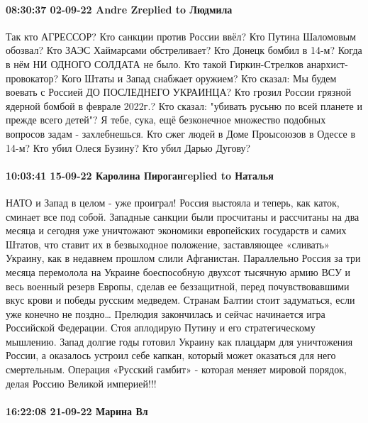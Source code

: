 \paragraph{08:30:37 02-09-22 Andre Zreplied to Людмила}

Так кто АГРЕССОР?
Кто санкции против России ввёл?
Кто Путина Шаломовым обозвал?
Кто ЗАЭС Хаймарсами обстреливает?
Кто Донецк бомбил в 14-м? Когда в нём НИ ОДНОГО СОЛДАТА не было.
Кто такой Гиркин-Стрелков анархист-провокатор?
Кого Штаты и Запад снабжает оружием?
Кто сказал: Мы будем воевать с Россией ДО ПОСЛЕДНЕГО УКРАИНЦА?
Кто грозил России грязной ядерной бомбой в феврале 2022г.?
Кто сказал: "убивать русьню по всей планете и прежде всего детей"?
Я тебе, сука, ещё безконечное множество подобных вопросов задам - захлебнешься.
Кто сжег людей в Доме Проысоюзов в Одессе в 14-м?
Кто убил Олеся Бузину?
Кто убил Дарью Дугову?

\paragraph{10:03:41 15-09-22 Каролина Пироганreplied to Наталья}

НАТО и Запад в целом - уже проиграл!
Россия выстояла и теперь, как каток, сминает все под собой.
Западные санкции были просчитаны и рассчитаны на два месяца и сегодня уже уничтожают экономики европейских государств и самих Штатов, что ставит их в безвыходное положение, заставляющее «сливать» Украину, как в недавнем прошлом слили Афганистан.
Параллельно Россия за три месяца перемолола на Украине боеспособную двухсот тысячную армию ВСУ и весь военный резерв Европы, сделав ее беззащитной, перед почувствовавшими вкус крови и победы русским медведем. Странам Балтии стоит задуматься, если уже конечно не поздно…
Прелюдия закончилась и сейчас начинается игра Российской Федерации.
Стоя аплодирую Путину и его стратегическому мышлению.
Запад долгие годы готовил Украину как плацдарм для уничтожения России, а оказалось устроил себе капкан, который может оказаться для него смертельным.
Операция «Русский гамбит» - которая меняет мировой порядок, делая Россию Великой империей!!!


\paragraph{16:22:08 21-09-22 Марина Вл}

